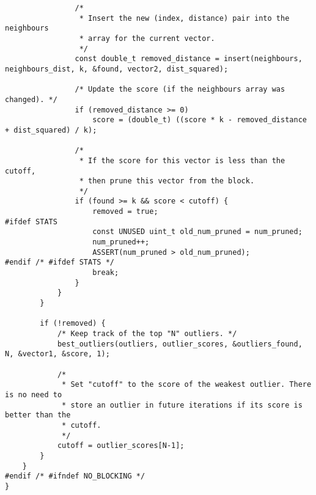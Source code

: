 \begin{lstlisting}
				/*
				 * Insert the new (index, distance) pair into the neighbours
				 * array for the current vector.
				 */
				const double_t removed_distance = insert(neighbours, neighbours_dist, k, &found, vector2, dist_squared);
				
				/* Update the score (if the neighbours array was changed). */
				if (removed_distance >= 0)
					score = (double_t) ((score * k - removed_distance + dist_squared) / k);
				
				/*
				 * If the score for this vector is less than the cutoff,
				 * then prune this vector from the block.
				 */
				if (found >= k && score < cutoff) {
					removed = true;
#ifdef STATS
					const UNUSED uint_t old_num_pruned = num_pruned;
					num_pruned++;
					ASSERT(num_pruned > old_num_pruned);
#endif /* #ifdef STATS */
					break;
				}
			}
		}
		
		if (!removed) {
			/* Keep track of the top "N" outliers. */
			best_outliers(outliers, outlier_scores, &outliers_found, N, &vector1, &score, 1);
			
			/*
			 * Set "cutoff" to the score of the weakest outlier. There is no need to
			 * store an outlier in future iterations if its score is better than the
			 * cutoff.
			 */
			cutoff = outlier_scores[N-1];
		}
	}
#endif /* #ifndef NO_BLOCKING */
}
\end{lstlisting}
